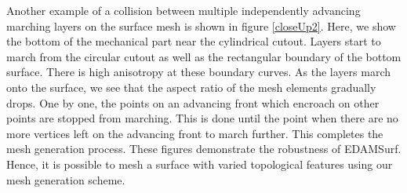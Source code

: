 Another example of a collision between multiple independently advancing marching layers on the surface mesh is shown in figure \ref{closeUp2}. Here, we show the bottom of the mechanical part near the cylindrical cutout. Layers start to march from the circular cutout as well as the rectangular boundary of the bottom surface. There is high anisotropy at these boundary curves. As the layers march onto the surface, we see that the aspect ratio of the mesh elements gradually drops. One by one, the points on an advancing front which encroach on other points are stopped from marching. This is done until the point when there are no more vertices left on the advancing front to march further. This completes the mesh generation process. These figures demonstrate the robustness of EDAMSurf. Hence, it is possible to mesh a surface with varied topological features using our mesh generation scheme.

